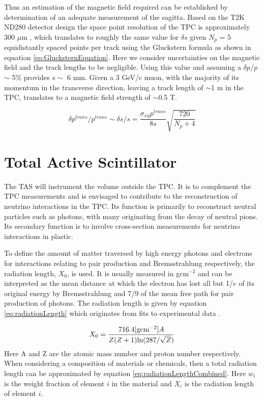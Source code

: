 Thus an estimation of the magnetic field required can be established by determination of an adequate measurement of the sagitta. Based on the T2K ND280 detector design the space point resolution of the TPC is approximately 300 $\mu$m \cite{internalT2K}, which translates to roughly the same value for $\delta s$ given $N_{p}$ = 5 equidistantly spaced points per track using the Gluckstern formula \cite{GlucksternFormula} as shown in equation \ref{eq:GlucksternEquation}. Here we consider uncertainties on the magnetic field and the track lengths to be negligible. Using this value and assuming a $\delta p/p$ $\sim$ 5\% provides $s \sim$ 6 mm. Given a 3 GeV/c muon, with the majority of its momentum in the transverse direction, leaving a track length of $\sim$1 m in the TPC, translates to a magnetic field strength of $\sim$0.5 T.

\begin{equation}
	\delta p^{trans}/p^{trans} \sim \delta s/s = \frac{\sigma_{xy}p^{trans}}{8s}\sqrt{\frac{720}{N_{p} + 4}}
	\label{eq:GlucksternEquation}
\end{equation}

\section{Total Active Scintillator}
The TAS will instrument the volume outside the TPC. It is to complement the TPC measurements and is envisaged to contribute to the reconstruction of neutrino interactions in the TPC. Its function is primarily to reconstruct neutral particles such as photons, with many originating from the decay of neutral pions. Its secondary function is to involve cross-section measurements for neutrino interactions in plastic.

To define the amount of matter traversed by high energy photons and electrons for interactions relating to pair production and Bremsstrahlung respectively, the radiation length, $X_{0}$, is used. It is usually measured in gcm$^{-2}$ and can be interpreted as the mean distance at which the electron has lost all but 1/$e$ of its original energy by Bremsstrahlung and 7/9 of the mean free path for pair production of photons. The radiation length is given by equation \ref{eq:radiationLength} which originates from fits to experimental data \cite{radiationLengthsBook}.

\begin{equation}
	X_{0} = \frac{716.4 [\textnormal{gcm}^{-2}] A}{Z(Z+1) \textnormal{ln}(287 / \sqrt{Z})}
	\label{eq:radiationLength}
\end{equation}
Here A and Z are the atomic mass number and proton number respectively. When considering a composition of materials or chemicals, then a total radiation length can be approximated by equation \ref{eq:radiationLengthCombined}. Here $w_{i}$ is the weight fraction of element $i$ in the material and $X_{i}$ is the radiation length of element $i$.

